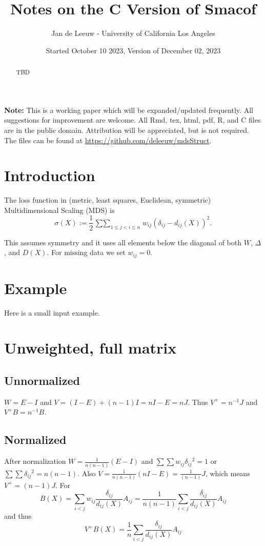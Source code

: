 \documentclass[
  12pt,
]{article}
\title{Notes on the C Version of Smacof}
\author{Jan de Leeuw - University of California Los Angeles}
\date{Started October 10 2023, Version of December 02, 2023}
\newcommand{\jis}{\mathop{\sum\sum}_{1\leq j<i\leq n}}
\begin{document}
\maketitle
\begin{abstract}
TBD
\end{abstract}

{
\setcounter{tocdepth}{4}
\tableofcontents
}
\textbf{Note:} This is a working paper which will be expanded/updated frequently. All suggestions for improvement are welcome. All Rmd, tex, html, pdf, R, and C files are in the public domain. Attribution
will be appreciated, but is not required. The files can be found at
\url{https://github.com/deleeuw/mdsStruct}.

\section{Introduction}\label{introduction}

The loss function in (metric, least squares, Euclidean, symmetric) Multidimensional Scaling (MDS)
is
\[
\sigma(X):=\frac12\jis w_{ij}(\delta_{ij}-d_{ij}(X))^2.
\]

This assumes symmetry and it uses all elements below the diagonal of both \(W\), \(\Delta\), and \(D(X)\).
For missing data we set \(w_{ij}=0\).

\section{Example}\label{example}

Here is a small input example.

\section{Unweighted, full matrix}\label{unweighted-full-matrix}

\subsection{Unnormalized}\label{unnormalized}

\(W=E-I\) and \(V=(I-E)+(n-1)I=nI-E=nJ\). Thus \(V^+=n^{-1}J\) and \(V^+B=n^{-1}B\).

\subsection{Normalized}\label{normalized}

After normalization \(W=\frac{1}{n(n-1)}(E-I)\) and \(\sum\sum w_{ij}\delta_{ij}{^2}=1\)
or \(\sum\sum\delta_{ij}{^2}=n(n-1)\). Also \(V=\frac{1}{n(n-1)}(nI-E)=\frac{1}{(n-1)}J\), which means \(V^+=(n-1)J\). For
\[
B(X)=\sum_{i<j}w_{ij}\frac{\delta_{ij}}{d_{ij}(X)}A_{ij}=\frac{1}{n(n-1)}\sum_{i<j}\frac{\delta_{ij}}{d_{ij}(X)}A_{ij}
\]
and thus
\[
V^+B(X)=\frac{1}{n}\sum_{i<j}\frac{\delta_{ij}}{d_{ij}(X)}A_{ij}
\]
\end{document}
